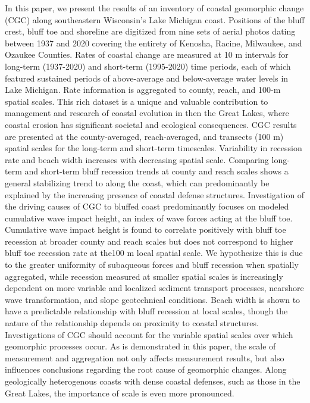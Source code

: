 In this paper, we present the results of an inventory of coastal geomorphic
change (CGC) along southeastern Wisconsin’s Lake Michigan coast. Positions of
the bluff crest, bluff toe and shoreline are digitized from nine sets of aerial
photos dating between 1937 and 2020 covering the entirety of Kenosha, Racine,
Milwaukee, and Ozaukee Counties. Rates of coastal change are measured at 10 m
intervals for long-term (1937-2020) and short-term (1995-2020) time periods,
each of which featured sustained periods of above-average and below-average
water levels in Lake Michigan. Rate information is aggregated to county, reach,
and 100-m spatial scales. This rich dataset is a unique and valuable
contribution to management and research of coastal evolution in then the Great
Lakes, where coastal erosion has significant societal and ecological
consequences.  CGC results are presented at the county-averaged, reach-averaged,
and transects (100 m) spatial scales for the long-term and short-term
timescales. Variability in recession rate and beach width increases with
decreasing spatial scale. Comparing long-term and short-term bluff recession
trends at county and reach scales shows a general stabilizing trend to along the
coast, which can predominantly be explained by the increasing presence of
coastal defense structures.  Investigation of the driving causes of CGC to
bluffed coast  predominantly focuses on modeled cumulative wave impact height,
an index of wave forces acting at the bluff toe. Cumulative wave impact height
is found to correlate positively with bluff toe recession at broader county and
reach scales but does not correspond to higher bluff toe recession rate at
the100 m local spatial scale. We hypothesize this is due to the greater
uniformity of subaqueous forces and bluff recession when spatially aggregated,
while recession measured at smaller spatial scales is increasingly dependent on
more variable and localized sediment transport processes, nearshore wave
transformation, and slope geotechnical conditions. Beach width is shown to have
a predictable relationship with bluff recession at local scales, though the
nature of the relationship depends on proximity to coastal structures. 
Investigations of CGC should account for the variable spatial scales over which
geomorphic processes occur. As is demonstrated in this paper, the scale of
measurement and aggregation not only affects measurement results, but also
influences conclusions regarding the root cause of geomorphic changes. Along
geologically heterogenous coasts with dense coastal defenses, such as those in
the Great Lakes, the importance of scale is even more pronounced. 
